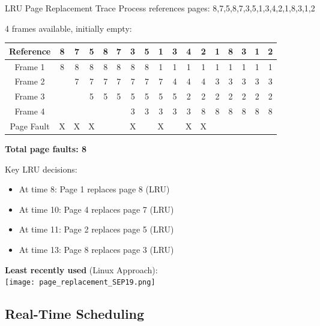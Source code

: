 \begin{example2}{LRU Page Replacement Trace}
    Process references pages: 8,7,5,8,7,3,5,1,3,4,2,1,8,3,1,2
    
    4 frames available, initially empty:
    
    \begin{tabular}{|c|c|c|c|c|c|c|c|c|c|c|c|c|c|c|c|c|}
        \hline
        Reference & 8 & 7 & 5 & 8 & 7 & 3 & 5 & 1 & 3 & 4 & 2 & 1 & 8 & 3 & 1 & 2 \\
        \hline
        Frame 1 & 8 & 8 & 8 & 8 & 8 & 8 & 8 & 1 & 1 & 1 & 1 & 1 & 1 & 1 & 1 & 1 \\
        Frame 2 &  & 7 & 7 & 7 & 7 & 7 & 7 & 7 & 4 & 4 & 4 & 3 & 3 & 3 & 3 & 3 \\
        Frame 3 &  &  & 5 & 5 & 5 & 5 & 5 & 5 & 5 & 2 & 2 & 2 & 2 & 2 & 2 & 2 \\
        Frame 4 &  &  &  &  &  & 3 & 3 & 3 & 3 & 3 & 8 & 8 & 8 & 8 & 8 & 8 \\
        \hline
        Page Fault & X & X & X &  &  & X &  & X &  & X & X &  &  &  &  &  \\
        \hline
    \end{tabular}
    
    \tcblower
    
    \textbf{Total page faults: 8}
    
    Key LRU decisions:
    \begin{itemize}
        \item At time 8: Page 1 replaces page 8 (LRU)
        \item At time 10: Page 4 replaces page 7 (LRU) 
        \item At time 11: Page 2 replaces page 5 (LRU)
        \item At time 13: Page 8 replaces page 3 (LRU)
    \end{itemize}

    \textbf{Least recently used} (Linux Approach):\\
    \texttt{[image: page\_replacement\_SEP19.png]}
\end{example2}

\subsection{Real-Time Scheduling}

